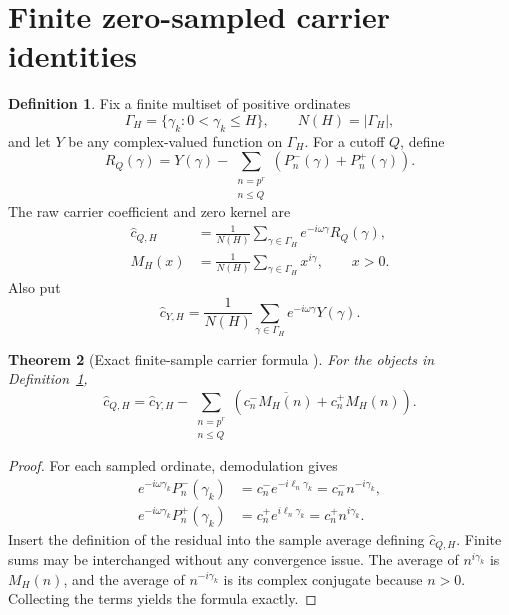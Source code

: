 \documentclass[11pt]{amsart}
\numberwithin{equation}{section}
\theoremstyle{plain}
\newtheorem{theorem}{Theorem}[section]
\theoremstyle{definition}
\newtheorem{definition}[theorem]{Definition}
\theoremstyle{remark}
\newcommand{\1}{\mathbf{1}}
\begin{document}
\section{Finite zero-sampled carrier identities}
\label{sec:exact_area_defect}

\begin{definition}
\label{def:abstract_sampled_model}
Fix a finite multiset of positive ordinates
\begin{equation}
\Gamma_H=\{\gamma_k:0<\gamma_k\leq H\},
\qquad N(H)=|\Gamma_H|,
\label{eq:abstract_GammaH}
\end{equation}
and let $Y$ be any complex-valued function on $\Gamma_H$.  For a cutoff
$Q$, define
\begin{equation}
R_Q(\gamma)
=
Y(\gamma)-
\sum_{\substack{n=p^r\\n\leq Q}}
\left(P_n^-(\gamma)+P_n^+(\gamma)\right).
\label{eq:abstract_RQ}
\end{equation}
The raw carrier coefficient and zero kernel are
\begin{align}
\widehat c_{Q,H}
&=
\frac1{N(H)}\sum_{\gamma\in\Gamma_H}
e^{-i\omega\gamma}R_Q(\gamma),
\label{eq:abstract_raw_carrier}
\\
M_H(x)
&=
\frac1{N(H)}\sum_{\gamma\in\Gamma_H}x^{i\gamma},
\qquad x>0.
\label{eq:abstract_MH}
\end{align}
Also put
\begin{equation}
\widehat c_{Y,H}
=
\frac1{N(H)}\sum_{\gamma\in\Gamma_H}
e^{-i\omega\gamma}Y(\gamma).
\label{eq:abstract_cYH}
\end{equation}
\end{definition}


\begin{theorem}[Exact finite-sample carrier formula {}]
\label{thm:abstract_carrier_formula}
For the objects in Definition~\ref{def:abstract_sampled_model},
\begin{equation}
\boxed{
\widehat c_{Q,H}
=
\widehat c_{Y,H}
-
\sum_{\substack{n=p^r\\n\leq Q}}
\left(c_n^-\overline{M_H(n)}+c_n^+M_H(n)\right).
}
\label{eq:abstract_carrier_formula}
\end{equation}
\end{theorem}

\begin{proof}
For each sampled ordinate, demodulation gives
\begin{align}
e^{-i\omega\gamma_k}P_n^-(\gamma_k)
&=
c_n^-e^{-i\ell_n\gamma_k}
=
c_n^-n^{-i\gamma_k},
\label{eq:abstract_carrier_minus_proof}
\\
e^{-i\omega\gamma_k}P_n^+(\gamma_k)
&=
c_n^+e^{i\ell_n\gamma_k}
=
c_n^+n^{i\gamma_k}.
\label{eq:abstract_carrier_plus_proof}
\end{align}
Insert the definition of the residual into the sample average defining
\(\widehat c_{Q,H}\).  Finite sums may be interchanged without any
convergence issue.  The average of \(n^{i\gamma_k}\) is \(M_H(n)\), and
the average of \(n^{-i\gamma_k}\) is its complex conjugate because
\(n>0\).  Collecting the terms yields the formula exactly.
\end{proof}
\end{document}
